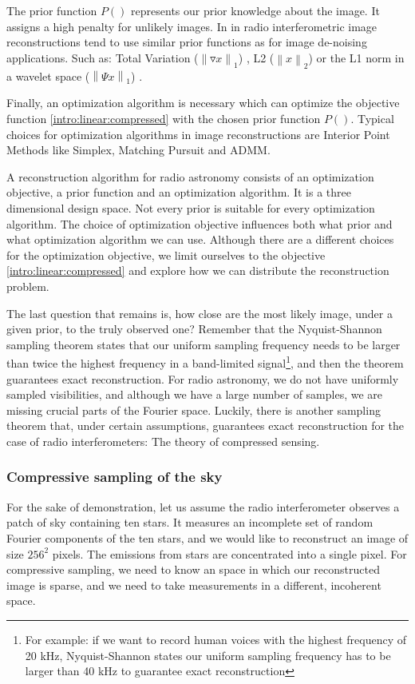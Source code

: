 The prior function $P()$ represents our prior knowledge about the image. It assigns a high penalty for unlikely images. In in radio interferometric image reconstructions tend to use similar prior functions as for image de-noising applications. Such as: Total Variation ($\left \| \triangledown x \right \|_1$) \cite{wiaux2009compressed}, L2 ($\left \|x \right \|_2$) \cite{ferrari2014distributed} or the L1 norm in a wavelet space ($\left \|\Psi x \right \|_1$) \cite{girard2015sparse}.

Finally, an optimization algorithm is necessary which can optimize the objective function \eqref{intro:linear:compressed} with the chosen prior function $P()$. Typical choices for optimization algorithms in image reconstructions are Interior Point Methods like Simplex, Matching Pursuit \cite{hogbom1974aperture} and ADMM\cite{carrillo2014purify}. 

A reconstruction algorithm for radio astronomy consists of an optimization objective, a prior function and an optimization algorithm. It is a three dimensional design space. Not every prior is suitable for every optimization algorithm. The choice of optimization objective influences both what prior and what optimization algorithm we can use. Although there are a different choices for the optimization objective, we limit ourselves to the objective \eqref{intro:linear:compressed} and explore how we can distribute the reconstruction problem.

The last question that remains is, how close are the most likely image, under a given prior, to the truly observed one? Remember that the Nyquist-Shannon sampling theorem states that our uniform sampling frequency needs to be larger than twice the highest frequency in a band-limited signal\footnote{For example: if we want to record human voices with the highest frequency of 20 kHz, Nyquist-Shannon states our uniform sampling frequency has to be larger than 40 kHz to guarantee exact reconstruction}, and then the theorem guarantees exact reconstruction. For radio astronomy, we do not have uniformly sampled visibilities, and although we have a large number of samples, we are missing crucial parts of the Fourier space. Luckily, there is another sampling theorem that, under certain assumptions, guarantees exact reconstruction for the case of radio interferometers: The theory of compressed sensing.

\subsubsection{Compressive sampling of the sky}
For the sake of demonstration, let us assume the radio interferometer observes a patch of sky containing ten stars. It measures an incomplete set of random Fourier components of the ten stars, and we would like to reconstruct an image of size $256^2$ pixels. The emissions from stars are concentrated into a single pixel. For compressive sampling, we need to know an space in which our reconstructed image is sparse, and we need to take measurements in a different, incoherent space.

